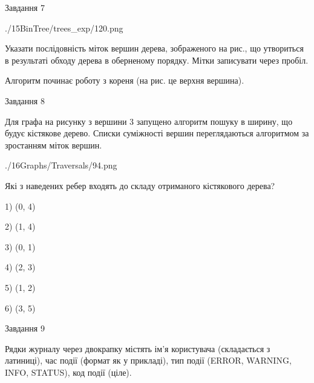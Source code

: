 \documentclass[12pt, ukrainian]{article}
\begin{document}
{\vspace{10mm}\par

\newpage
\begin{minipage}[t]{9.7cm}
               
{\begin{center}Завдання {7}\end{center}}
\vspace{-6mm}

\begin{center}
	{./15BinTree/trees_exp/120.png}
\end{center}
Указати послідовність міток вершин дерева, зображеного на рис., що утвориться в результаті обходу дерева в оберненому порядку. Мітки записувати через пробіл.\par Алгоритм починає роботу з кореня (на рис. це верхня вершина).\par

\end{minipage}
\vline \hspace{8mm}
\begin{minipage}[t]{8.0cm}
               
{\begin{center}Завдання {8}\end{center}}
\vspace{-6mm}
Для графа на рисунку з вершини 3 запущено алгоритм пошуку в ширину, що будує кістякове дерево. Списки суміжності вершин переглядаються алгоритмом за зростанням міток вершин.\par
\begin{center}
	{./16Graphs/Traversals/94.png}
\end{center}
\par Які з наведених ребер входять до складу отриманого кістякового дерева?\par
1) (0, 4)\par
2) (1, 4)\par
3) (0, 1)\par
4) (2, 3)\par
5) (1, 2)\par
6) (3, 5)\par
{\vskip 15pt} \par

\end{minipage}

               
{\begin{center}Завдання {9}\end{center}}
\vspace{-6mm}
Рядки журналу через двокрапку містять ім'я користувача (складається з латиниці), час події (фор\-мат як у прикладі), тип події (ERROR, WARNING, INFO, STATUS), код події (ціле).

}
\end{document}
